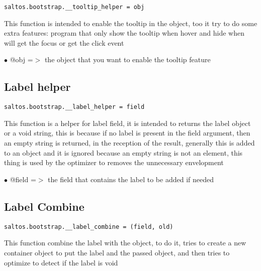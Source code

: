 \documentclass[a4paper]{book}
\begin{document}
\begin{lstlisting}
saltos.bootstrap.__tooltip_helper = obj
\end{lstlisting}

This function is intended to enable the tooltip in the object, too it try to do some
extra features: program that only show the tooltip when hover and hide when will get
the focus or get the click event

\begin{compactitem}
\item[\color{myblue}$\bullet$] @obj =$>$ the object that you want to enable the tooltip feature
\end{compactitem}

\hypertarget{toc469}{}
\subsection{Label helper}

\begin{lstlisting}
saltos.bootstrap.__label_helper = field
\end{lstlisting}

This function is a helper for label field, it is intended to returns the
label object or a void string, this is because if no label is present in
the field argument, then an empty string is returned, in the reception
of the result, generally this is added to an object and it is ignored
because an empty string is not an element, this thing is used by the
optimizer to removes the unnecessary envelopment

\begin{compactitem}
\item[\color{myblue}$\bullet$] @field =$>$ the field that contains the label to be added if needed
\end{compactitem}

\hypertarget{toc470}{}
\subsection{Label Combine}

\begin{lstlisting}
saltos.bootstrap.__label_combine = (field, old)
\end{lstlisting}

This function combine the label with the object, to do it, tries to create a new
container object to put the label and the passed object, and then tries to optimize
to detect if the label is void
\end{document}
